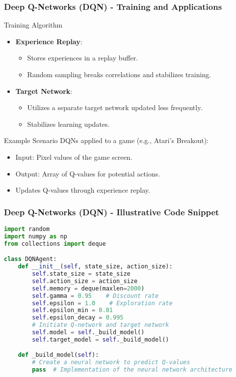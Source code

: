 \documentclass[aspectratio=169]{beamer}
\begin{document}
\begin{frame}[fragile]
  \frametitle{Deep Q-Networks (DQN) - Training and Applications}
  \begin{block}{Training Algorithm}
    \begin{itemize}
      \item \textbf{Experience Replay}: 
        \begin{itemize}
          \item Stores experiences in a replay buffer.
          \item Random sampling breaks correlations and stabilizes training.
        \end{itemize}
        
      \item \textbf{Target Network}:
        \begin{itemize}
          \item Utilizes a separate target network updated less frequently.
          \item Stabilizes learning updates.
        \end{itemize}
    \end{itemize}
  \end{block}

  \begin{block}{Example Scenario}
    DQNs applied to a game (e.g., Atari's Breakout):
    \begin{itemize}
      \item Input: Pixel values of the game screen.
      \item Output: Array of Q-values for potential actions.
      \item Updates Q-values through experience replay.
    \end{itemize}
  \end{block}
\end{frame}

\begin{frame}[fragile]
  \frametitle{Deep Q-Networks (DQN) - Illustrative Code Snippet}
  \begin{lstlisting}[language=Python]
import random
import numpy as np
from collections import deque

class DQNAgent:
    def __init__(self, state_size, action_size):
        self.state_size = state_size
        self.action_size = action_size
        self.memory = deque(maxlen=2000)
        self.gamma = 0.95    # Discount rate
        self.epsilon = 1.0    # Exploration rate
        self.epsilon_min = 0.01
        self.epsilon_decay = 0.995
        # Initiate Q-network and target network
        self.model = self._build_model()
        self.target_model = self._build_model()

    def _build_model(self):
        # Create a neural network to predict Q-values
        pass  # Implementation of the neural network architecture
  \end{lstlisting}
\end{frame}
\end{document}
